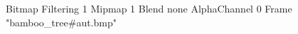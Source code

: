 {Bitmap
	{Filtering 1}
	{Mipmap 1}
	{Blend none}
	{AlphaChannel 0}
	{Frame "bamboo_tree#aut.bmp"}
}
